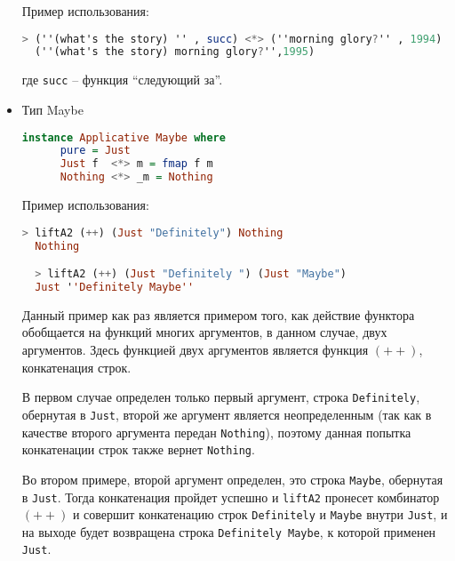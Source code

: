 \begin{itemize}
  Пример использования:
  \begin{lstlisting}[language=Haskell]
  > (''(what's the story) '' , succ) <*> (''morning glory?'' , 1994)
  (''(what's the story) morning glory?'',1995)
  \end{lstlisting}
  где \verb"succ" -- функция ``следующий за''.

  \item Тип Maybe
  \begin{lstlisting}[language=Haskell]
    instance Applicative Maybe where
      pure = Just
      Just f  <*> m = fmap f m
      Nothing <*> _m = Nothing
  \end{lstlisting}

  Пример использования:
  \begin{lstlisting}[language=Haskell]
  > liftA2 (++) (Just "Definitely") Nothing
  Nothing

  > liftA2 (++) (Just "Definitely ") (Just "Maybe")
  Just ''Definitely Maybe''
  \end{lstlisting}

Данный пример как раз является примером того, как действие функтора обобщается на функций многих аргументов,
в данном случае, двух аргументов. Здесь функцией двух аргументов является функция $(++)$, конкатенация строк.

В первом случае определен только первый аргумент, строка \verb"Definitely", обернутая в \verb"Just",
второй же аргумент является неопределенным (так как в качестве второго аргумента передан \verb"Nothing"),
поэтому данная попытка конкатенации строк также вернет \verb"Nothing".

Во втором примере, второй аргумент определен, это строка \verb"Maybe", обернутая в \verb"Just".
Тогда конкатенация пройдет успешно и \verb"liftA2" пронесет комбинатор $(++)$ и совершит конкатенацию строк
\verb"Definitely" и \verb"Maybe" внутри \verb"Just", и на выходе будет возвращена строка \verb"Definitely Maybe",
к которой применен \verb"Just".
\end{itemize}

